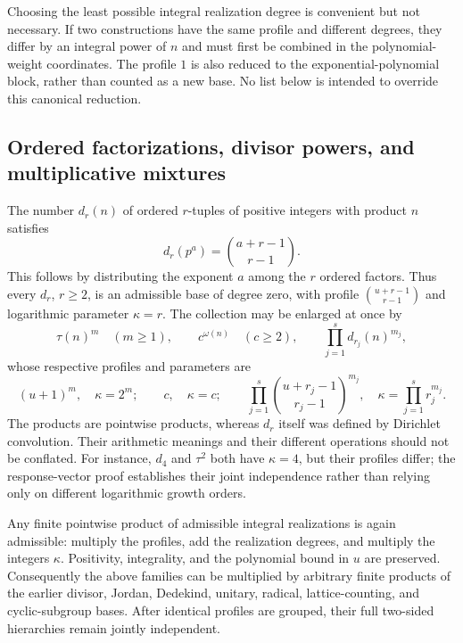 Choosing the least possible integral realization degree is convenient but
not necessary. If two constructions have the same profile and different
degrees, they differ by an integral power of $n$ and must first be combined
in the polynomial-weight coordinates. The profile $1$ is also reduced to
the exponential-polynomial block, rather than counted as a new base.
No list below is intended to override this canonical reduction.

\subsection{Ordered factorizations, divisor powers, and multiplicative mixtures}

The number $d_r(n)$ of ordered $r$-tuples of positive integers with product
$n$ satisfies
\[
 d_r(p^a)=\binom{a+r-1}{r-1}.
\]
This follows by distributing the exponent $a$ among the $r$ ordered
factors. Thus every $d_r$, $r\geq2$, is an admissible base of degree zero,
with profile $\binom{u+r-1}{r-1}$ and logarithmic parameter $\kappa=r$.
The collection may be enlarged at once by
\[
 \tau(n)^m\quad(m\geq1),\qquad
 c^{\omega(n)}\quad(c\geq2),\qquad
 \prod_{j=1}^s d_{r_j}(n)^{m_j},
\]
whose respective profiles and parameters are
\[
 (u+1)^m,\quad \kappa=2^m;
 \qquad c,\quad\kappa=c;
 \qquad \prod_{j=1}^s\binom{u+r_j-1}{r_j-1}^{m_j},
       \quad\kappa=\prod_{j=1}^s r_j^{m_j}.
\]
The products are pointwise products, whereas $d_r$ itself was defined by
Dirichlet convolution. Their arithmetic meanings and their different
operations should not be conflated. For instance, $d_4$ and $\tau^2$
both have $\kappa=4$, but their profiles differ; the response-vector proof
establishes their joint independence rather than relying only on different
logarithmic growth orders.

Any finite pointwise product of admissible integral realizations is again
admissible: multiply the profiles, add the realization degrees, and multiply
the integers $\kappa$. Positivity, integrality, and the polynomial bound in
$u$ are preserved. Consequently the above families can be multiplied by
arbitrary finite products of the earlier divisor, Jordan, Dedekind,
unitary, radical, lattice-counting, and cyclic-subgroup bases.
After identical profiles are grouped, their full two-sided hierarchies
remain jointly independent.

